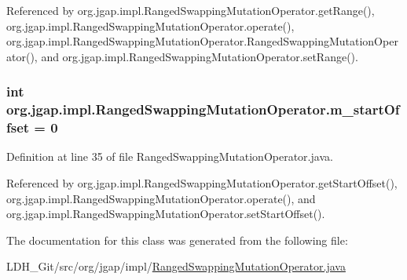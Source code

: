 Referenced by org.\-jgap.\-impl.\-Ranged\-Swapping\-Mutation\-Operator.\-get\-Range(), org.\-jgap.\-impl.\-Ranged\-Swapping\-Mutation\-Operator.\-operate(), org.\-jgap.\-impl.\-Ranged\-Swapping\-Mutation\-Operator.\-Ranged\-Swapping\-Mutation\-Operator(), and org.\-jgap.\-impl.\-Ranged\-Swapping\-Mutation\-Operator.\-set\-Range().

\hypertarget{classorg_1_1jgap_1_1impl_1_1_ranged_swapping_mutation_operator_ade9167f0107edaa7b8f6862fe550ab30}{
\subsubsection[{m\-\_\-start\-Offset}]{\setlength{\rightskip}{0pt plus 5cm}int org.\-jgap.\-impl.\-Ranged\-Swapping\-Mutation\-Operator.\-m\-\_\-start\-Offset = 0\hspace{0.3cm}{\ttfamily [private]}}}\label{classorg_1_1jgap_1_1impl_1_1_ranged_swapping_mutation_operator_ade9167f0107edaa7b8f6862fe550ab30}


Definition at line 35 of file Ranged\-Swapping\-Mutation\-Operator.\-java.



Referenced by org.\-jgap.\-impl.\-Ranged\-Swapping\-Mutation\-Operator.\-get\-Start\-Offset(), org.\-jgap.\-impl.\-Ranged\-Swapping\-Mutation\-Operator.\-operate(), and org.\-jgap.\-impl.\-Ranged\-Swapping\-Mutation\-Operator.\-set\-Start\-Offset().



The documentation for this class was generated from the following file\-:\begin{DoxyCompactItemize}
\item 
L\-D\-H\-\_\-\-Git/src/org/jgap/impl/\hyperlink{_ranged_swapping_mutation_operator_8java}{Ranged\-Swapping\-Mutation\-Operator.\-java}\end{DoxyCompactItemize}
